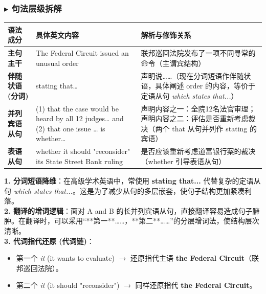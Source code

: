 \documentclass[cn,normal,11pt]{elegantnote}
\begin{document}
\subsubsection*{$\blacktriangleright$ 句法层级拆解}
\noindent
\begin{tabularx}{\textwidth}{p{3.2cm} X X}
  \toprule
  \textbf{语法成分} & \textbf{具体英文内容} & \textbf{解析与修饰关系} \\
  \midrule
  \textbf{主句主干} & The Federal Circuit issued an unusual order & 联邦巡回法院发布了一项不同寻常的命令（主谓宾结构） \\
  \midrule
  \textbf{伴随状语 (分词)} & stating that… & 声明说……（现在分词短语作伴随状语，具体阐述 order 的内容，等价于定语从句 \textit{which states that...}） \\
  \midrule
  \textbf{并列宾语从句} & (1) that the case would be heard by all 12 judges… and (2) that one issue … is whether… & 声明内容之一：全院12名法官审理；声明内容之二：评估是否重新考虑裁决（两个 that 从句并列作 stating 的宾语） \\
  \midrule
  \textbf{表语从句} & whether it should "reconsider" its State Street Bank ruling & 是否应该重新考虑道富银行案的裁决（whether 引导表语从句） \\
  \bottomrule
\end{tabularx}

\begin{proposition}[分词短语降维与代词链还原]
  \textbf{1. 分词短语降维}：在高级学术英语中，常使用 \textbf{stating that...} 代替复杂的定语从句 \textit{which states that...}。这是为了减少从句的多层嵌套，使句子结构更加紧凑利落。\\
  \textbf{2. 翻译的增词逻辑}：面对 A and B 的长并列宾语从句，直接翻译容易造成句子臃肿。在翻译时，可以采用“**第一**……，**第二**……”的分层增词法，使结构层次清晰。\\
  \textbf{3. 代词指代还原 (代词链)}：
  \begin{itemize}
    \item 第一个 \textit{it} (it wants to evaluate) $\rightarrow$ 还原指代主语 \textbf{the Federal Circuit}（联邦巡回法院）。
    \item 第二个 \textit{it} (it should "reconsider") $\rightarrow$ 同样还原指代 \textbf{the Federal Circuit}。
  \end{itemize}
\end{proposition}
\end{document}
